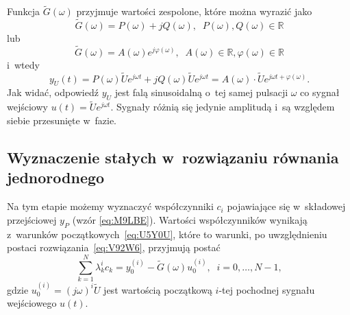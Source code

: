 \documentclass[paper=a4,DIV=12]{lpas}
\begin{document}
Funkcja $\tilde{G}\left(\omega\right)$ przyjmuje wartości zespolone, które
można wyrazić jako
\begin{equation}
  \tilde{G}\left(\omega\right) = P\left(\omega\right) + j Q\left(\omega\right),
  \;\; P\left(\omega\right), Q\left(\omega\right) \in \mathbb{R}
  \label{eq:9B5N7}
\end{equation}
lub
\begin{equation}
  \tilde{G}\left(\omega\right) = A\left(\omega\right) e^{j \varphi\left(\omega\right)},
  \;\; A\left(\omega\right) \in \mathbb{R}, \varphi\left(\omega\right) \in \mathbb{R}
  \label{eq:3LDB7}
\end{equation}
i~wtedy
\begin{equation}
  y_U(t)
  = P\left(\omega\right) \tilde{U} e^{j \omega t}
  + j Q\left(\omega\right) \tilde{U} e^{j \omega t}
  = A\left(\omega\right) \cdot \tilde{U} e^{j \omega t + \varphi\left(\omega\right)}.
  \label{eq:4IJQ6}
\end{equation}
Jak widać, odpowiedź $y_U$ jest falą sinusoidalną o~tej samej pulsacji
$\omega$ co sygnał wejściowy $u(t) = \tilde{U} e^{j \omega t}$. Sygnały
różnią się jedynie amplitudą i~są względem siebie przesunięte w~fazie.

\subsection{Wyznaczenie stałych w~rozwiązaniu równania jednorodnego}
\label{sec:JHXCT}

Na tym etapie możemy wyznaczyć współczynniki $c_i$ pojawiające się
w~składowej przejściowej $y_P$ (wzór \eqref{eq:M9LBE}). Wartości
współczynników wynikają z~warunków początkowych~\eqref{eq:U5Y0U}, które to
warunki, po uwzględnieniu postaci rozwiązania~\eqref{eq:V92W6}, przyjmują
postać
\begin{equation}
  \sum_{k = 1}^{N} \lambda_k^{i} c_k  = y_0^{(i)} - \tilde{G}\left(\omega\right) u_0^{(i)},
  \;\; i = 0, \dots, N-1,
  \label{eq:FVRCD}
\end{equation}
gdzie $u_0^{(i)} = (j \omega)^i \tilde{U}$ jest wartością początkową
$i$-tej pochodnej sygnału wejściowego $u(t)$.
\end{document}
